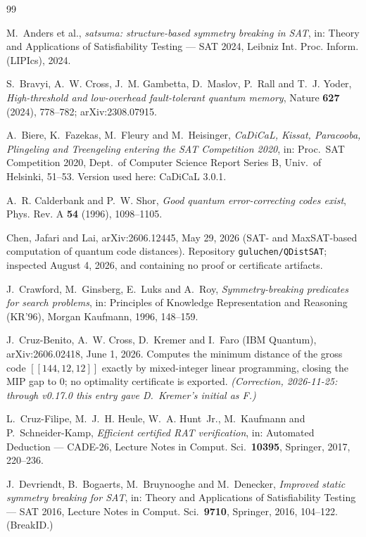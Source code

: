 \documentclass[11pt]{amsart}
\theoremstyle{plain}
\theoremstyle{definition}
\theoremstyle{remark}
\begin{document}
\begin{thebibliography}{99}

M.~Anders et al.,
\emph{satsuma: structure-based symmetry breaking in SAT},
in: Theory and Applications of Satisfiability Testing --- SAT 2024,
Leibniz Int. Proc. Inform. (LIPIcs), 2024.

S.~Bravyi, A.~W. Cross, J.~M. Gambetta, D.~Maslov, P.~Rall and T.~J. Yoder,
\emph{High-threshold and low-overhead fault-tolerant quantum memory},
Nature \textbf{627} (2024), 778--782; arXiv:2308.07915.

A.~Biere, K.~Fazekas, M.~Fleury and M.~Heisinger,
\emph{CaDiCaL, Kissat, Paracooba, Plingeling and Treengeling entering the SAT
Competition 2020}, in: Proc.\ SAT Competition 2020, Dept.\ of Computer
Science Report Series B, Univ.\ of Helsinki, 51--53.
Version used here: CaDiCaL 3.0.1.

A.~R. Calderbank and P.~W. Shor,
\emph{Good quantum error-correcting codes exist},
Phys. Rev. A \textbf{54} (1996), 1098--1105.

Chen, Jafari and Lai,
arXiv:2606.12445, May 29, 2026 (SAT- and MaxSAT-based computation of quantum
code distances). Repository \texttt{guluchen/QDistSAT}; inspected
August 4, 2026, and containing no proof or certificate artifacts.

J.~Crawford, M.~Ginsberg, E.~Luks and A.~Roy,
\emph{Symmetry-breaking predicates for search problems},
in: Principles of Knowledge Representation and Reasoning (KR'96),
Morgan Kaufmann, 1996, 148--159.

J.~Cruz-Benito, A.~W. Cross, D.~Kremer and I.~Faro (IBM Quantum),
arXiv:2606.02418, June 1, 2026. Computes the minimum distance of the gross
code $[[144,12,12]]$ exactly by mixed-integer linear programming, closing the
MIP gap to $0$; no optimality certificate is exported.
\emph{(Correction, 2026-11-25: through v0.17.0 this entry gave D.~Kremer's
initial as F.)}

L.~Cruz-Filipe, M.~J.~H. Heule, W.~A. Hunt~Jr., M.~Kaufmann and
P.~Schneider-Kamp,
\emph{Efficient certified RAT verification},
in: Automated Deduction --- CADE-26, Lecture Notes in Comput. Sci.\
\textbf{10395}, Springer, 2017, 220--236.

J.~Devriendt, B.~Bogaerts, M.~Bruynooghe and M.~Denecker,
\emph{Improved static symmetry breaking for SAT},
in: Theory and Applications of Satisfiability Testing --- SAT 2016,
Lecture Notes in Comput. Sci.\ \textbf{9710}, Springer, 2016, 104--122.
(BreakID.)


\end{thebibliography}
\end{document}
